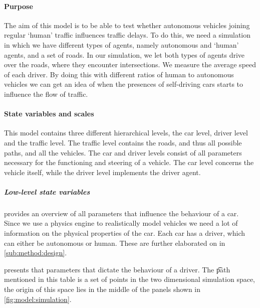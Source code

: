 \paragraph{Purpose}
\label{par:method:model:overview:purpose}
The aim of this model is to be able to test whether autonomous vehicles joining regular `human' traffic influences traffic delays. To do this, we need a simulation in which we have different types of agents, namely autonomous and `human' agents, and a set of roads. In our simulation, we let both types of agents drive over the roads, where they encounter intersections. We  measure the average speed of each driver. By doing this with different ratios of human to autonomous vehicles we can get an idea of when the presences of self-driving cars starts to influence the flow of traffic.

\paragraph{State variables and scales}
\label{par:method:model:overview:state}
This model contains three different hierarchical levels, the car level, driver level and the traffic level. The traffic level contains the roads, and thus all possible paths, and all the vehicles. The car and driver levels consist of all parameters necessary for the functioning and steering of a vehicle. The car level concerns the vehicle itself, while the driver level implements the driver agent.

\subparagraph{Low-level state variables}
 provides an overview of all parameters that influence the behaviour of a car. 
Since we use a physics engine to realistically model vehicles we need a lot of information on the physical properties of the car. 
Each car has a driver, which can either be autonomous or human. These are further elaborated on in \cref{sub:method:design}.

 presents that parameters that dictate the behaviour of a driver. The \t{path} mentioned in this table is a set of points in the two dimensional simulation space, the origin of this space lies in the middle of the panels shown in \cref{fig:model:simulation}. 

